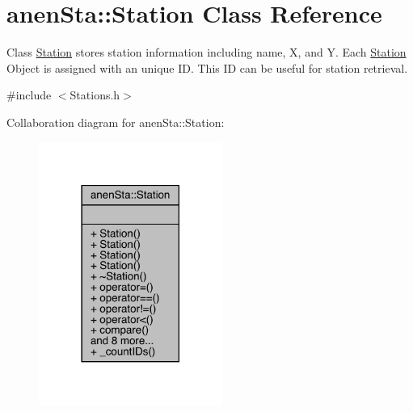 \hypertarget{classanen_sta_1_1_station}{}\section{anen\+Sta\+:\+:Station Class Reference}
\label{classanen_sta_1_1_station}


Class \mbox{\hyperlink{classanen_sta_1_1_station}{Station}} stores station information including name, X, and Y. Each \mbox{\hyperlink{classanen_sta_1_1_station}{Station}} Object is assigned with an unique ID. This ID can be useful for station retrieval.  




{\ttfamily \#include $<$Stations.\+h$>$}



Collaboration diagram for anen\+Sta\+:\+:Station\+:\nopagebreak
\begin{figure}[H]
\begin{center}
\leavevmode
\includegraphics[width=170pt]{classanen_sta_1_1_station__coll__graph}
\end{center}
\end{figure}
